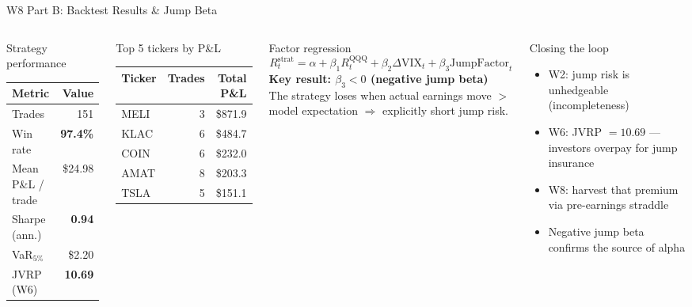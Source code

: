 \documentclass[aspectratio=169,10pt]{beamer}
\begin{document}
\begin{frame}{W8 Part B: Backtest Results \& Jump Beta}
\begin{columns}[T]
\begin{block}{Strategy performance}
\footnotesize
\begin{tabular}{lr}
\toprule
Metric & Value \\
\midrule
Trades & 151 \\
Win rate & \textbf{97.4\%} \\
Mean P\&L / trade & \$24.98 \\
Sharpe (ann.) & \textbf{0.94} \\
VaR$_{5\%}$ & \$2.20 \\
JVRP (W6) & \textbf{10.69} \\
\bottomrule
\end{tabular}
\end{block}

\begin{block}{Top 5 tickers by P\&L}
\footnotesize
\begin{tabular}{lrr}
\toprule
Ticker & Trades & Total P\&L \\
\midrule
MELI & 3 & \$871.9 \\
KLAC & 6 & \$484.7 \\
COIN & 6 & \$232.0 \\
AMAT & 8 & \$203.3 \\
TSLA & 5 & \$151.1 \\
\bottomrule
\end{tabular}
\end{block}

\begin{block}{Factor regression}
\footnotesize
\[
  R^{\mathrm{strat}}_t = \alpha + \beta_1 R^{\mathrm{QQQ}}_t
  + \beta_2 \Delta\mathrm{VIX}_t + \beta_3 \mathrm{JumpFactor}_t
\]
\textbf{Key result: $\beta_3 < 0$ (negative jump beta)}\\[3pt]
The strategy loses when actual earnings move $>$ model expectation $\Rightarrow$ explicitly short jump risk.
\end{block}

\begin{alertblock}{Closing the loop}
\footnotesize
\begin{itemize}\itemsep2pt
  \item W2: jump risk is unhedgeable (incompleteness)
  \item W6: JVRP $= 10.69$ — investors overpay for jump insurance
  \item W8: harvest that premium via pre-earnings straddle
  \item Negative jump beta confirms the source of alpha
\end{itemize}
\end{alertblock}
\end{columns}
\end{frame}
\end{document}
